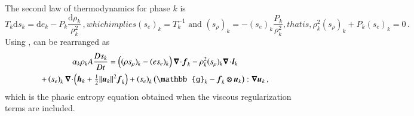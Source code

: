 \documentclass[preprint,10pt]{elsarticle}
\begin{document}
%
The second law of thermodynamics for phase $k$ is 
%
\begin{subequations}
\begin{equation}\label{eq:2nd-therm-laws-sect4}
T_k \text{d} s_k = \text{d}e_k - P_k\frac{\text{d}\rho_k}{\rho_k^2} \,,
\end{equation}
which implies 
\begin{equation}
(s_e)_k = T_k^{-1} \text{ and } (s_\rho)_k = - (s_e)_k \frac{P_k }{\rho_k^2} ,
\end{equation}
that is, 
\begin{equation} \label{eq:expr-zero}
\rho_k^2 (s_\rho)_k + P_k (s_e)_k  = 0 \,.
\end{equation}
\end{subequations}
% 
Using ,  can be rearranged as 
\begin{multline}\label{eq:ent-res-7-eqn-diss-terms_rearranged}
\alpha_k \rho_k A \frac{Ds_k}{Dt} 
=  \left( (\rho s_\rho)_k - (e s_e)_k \right) \div \mbold f_k 
- \rho^2_k (s_\rho)_k \div \mbold l_k  \\
+ \left(s_e\right)_k \div \left( \mbold h_k + \tfrac{1}{2} \| \mbold u_k \|^2  \mbold f_k \right)
+ \left(s_e\right)_k \left( \mathbb{g}_k - \mbold f_k \otimes \mbold u_k \right) : \grad \mbold u_k 
\,,
\end{multline}
which is the phasic entropy equation obtained when the viscous regularization terms are included.
%
\end{document}
